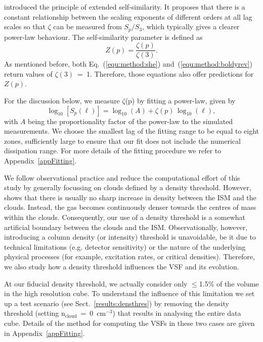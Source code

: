 \documentclass{aa}		%
\begin{document}
\citet{Benzi1993} introduced the principle of extended self-similarity.
It proposes that there is a constant relationship between the scaling
exponents of different orders at all lag scales so that $\zeta$ can be measured from $S_p/S_3$, which typically gives a clearer power-law behaviour.
The self-similarity parameter is defined as
\begin{equation}
	Z(p) = \frac{\zeta(p)}{\zeta(3)}.
	\label{equ:method:z_def}
\end{equation} 
\noindent
As mentioned before, both Eq.~(\ref{equ:method:she}) and~(\ref{equ:method:boldyrev}) return values of $\zeta(3)$~=~1.
Therefore, those equations also offer predictions for $Z(p)$.

For the discussion below, we measure $\zeta$(p) by fitting a power-law, given by
\begin{equation}
	\log_{10}\left[ S_p(\ell) \right] = \log_{10}\left(A\right) + \zeta(p) \, \log_{10}(\ell) ,
	\label{equ:method:fitting}
\end{equation}
with $A$ being the proportionality factor of the power-law to the simulated measurements.
We choose the smallest lag of the fitting range to be equal to eight zones, sufficiently large to ensure that our fit does not include the numerical dissipation range.
For more details of the fitting procedure we refer to Appendix~\ref{appFitting}.

We follow observational practice and reduce the computational effort of this study by generally focussing on clouds defined by a density threshold.
However,  shows that there is usually no sharp increase in density between the ISM and the clouds. 
Instead, the gas becomes continuously denser towards the centres of mass within the clouds. 
Consequently, our use of a density threshold is a somewhat artificial boundary between the clouds and the ISM. Observationally, however, introducing a column density (or intensity) threshold is unavoidable, be it due to technical limitations (e.g. detector sensitivity) or the nature of the underlying physical processes (for example, excitation rates, or critical densities).
Therefore, we also study how a density threshold influences the VSF and its evolution.

At our fiducial density threshold, we actually consider only $\leq$1.5\% of the volume in the high resolution cube.
To understand the influence of this limitation we set up a test scenario (see Sect.~\ref{results:densthres}) by removing the density threshold (setting n$_\mathrm{cloud}$~=~0~cm$^{-3}$) that results in analysing the entire data cube.
Details of the method for computing the VSFs in these two cases are given in Appendix~\ref{appFitting}.
\end{document}
